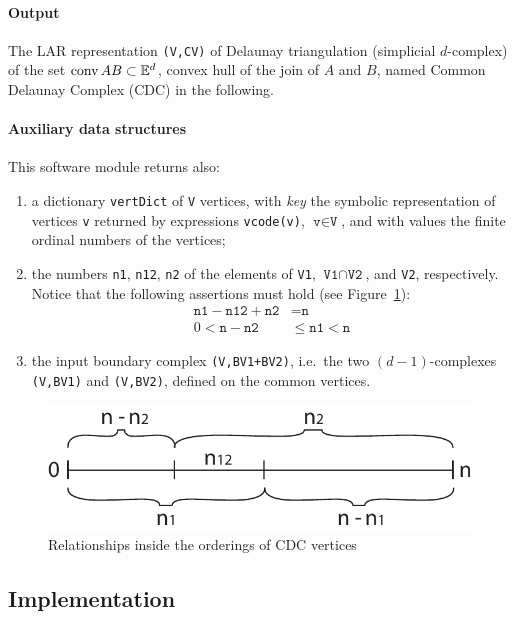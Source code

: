 \documentclass[11pt,oneside]{article}	%
\def\conv{\mbox{\textrm{conv}\,}}
\def\E{\mathbb{E}}
\def\conv{\mbox{\rm conv}\,}
\begin{document}
\paragraph{Output} 
The LAR representation \texttt{(V,CV)} of Delaunay triangulation (simplicial $d$-complex) of the set $\conv AB \subset \E^d$, convex hull of the join of $A$ and $B$, named Common Delaunay Complex (CDC) in the following.

\paragraph{Auxiliary data structures} 
This software module returns also:

\begin{enumerate}
\item 
a dictionary \texttt{vertDict} of \texttt{V} vertices, with \emph{key} the symbolic representation of vertices \texttt{v} returned by expressions \texttt{vcode(v)}, $\texttt{v}\in \texttt{V}$, and with values the finite ordinal numbers of the vertices;

\item 
the numbers \texttt{n1}, \texttt{n12}, \texttt{n2} of the elements of \texttt{V1}, $\texttt{V1}\cap\texttt{V2}$, and \texttt{V2}, respectively. Notice that the following assertions must hold (see Figure~\ref{fig:bounds}):
\begin{align}
\texttt{n1} - \texttt{n12} + \texttt{n2} &= \texttt{n} \\
0 < \texttt{n} - \texttt{n2}  &\leq  \texttt{n1}  <  \texttt{n} 
\end{align}

\item the input boundary complex \texttt{(V,BV1+BV2)}, i.e.~the two $(d-1)$-complexes \texttt{(V,BV1)} and \texttt{(V,BV2)}, defined on the common vertices.
\end{enumerate}

\begin{figure}[htbp] %
   \centering
   \includegraphics[width=0.5\linewidth]{images/bounds} 
   \caption{Relationships inside the orderings of CDC vertices}
   \label{fig:bounds}
\end{figure}

\subsection{Implementation}
\end{document}

